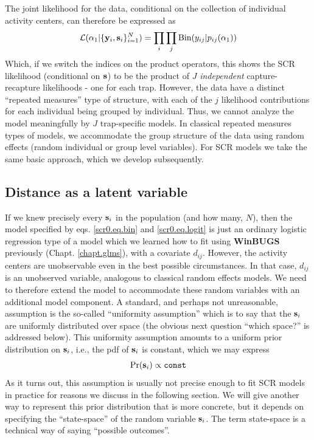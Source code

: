 The joint likelihood for the
data, conditional on the collection of individual activity centers,
can therefore be expressed as
\[
{\cal L}(\alpha_{1} | \{ {\bf y}_{i},{\bf s}_{i} \}_{i=1}^{N})
 =  \prod_{i} \prod_{j} \mbox{Bin}(y_{ij}|p_{ij}(\alpha_{1}))
\]
Which, if we switch the indices on the product operators, this shows
the SCR likelihood (conditional on ${\bf s}$) to be the product of $J$
{\it independent} capture-recapture likelihoods - one for each trap.
However, the data have a distinct ``repeated measures'' type of structure, with
each of the $j$ likelihood contributions for each individual being
grouped by individual. Thus, we cannot analyze the model
meaningfully by $J$ trap-specific models. In classical repeated measures
types of models, we accommodate the group structure of the data using
random effects (random individual or group level variables). For SCR
models we take the same basic approach, which we develop subsequently.

\subsection{Distance as a latent variable}

If we knew precisely every ${\bf s}_{i}$ in the population (and how
many, $N$), then the model specified by eqs. \ref{scr0.eq.bin} and
\ref{scr0.eq.logit} is just an ordinary logistic
regression type of a model which we learned how to fit using {\bf
  WinBUGS} previously (Chapt. \ref{chapt.glms}), with a covariate $d_{ij}$. However,
the activity centers are unobservable even in the best possible
circumstances. In that case, $d_{ij}$ is an unobserved variable,
analogous to classical random effects models. We need to therefore
extend the model to accommodate these random variables with an
additional model component. A standard, and perhaps not unreasonable,
assumption is the so-called ``uniformity assumption'' which is to say
that the ${\bf s}_{i}$ are uniformly distributed over space (the
obvious next question ``which space?'' is addressed below).  This
uniformity assumption amounts to a uniform prior distribution on ${\bf
  s}_{i}$, i.e., the pdf of ${\bf s}_{i}$ is constant, which we may
express
\begin{equation}
	\Pr({\bf s}_{i}) \propto \mbox{\tt const}
\label{scr0.eq.sprior}
\end{equation}
 As it turns out, this assumption is usually not precise
enough to fit SCR models in practice for reasons we discuss in the
following section.  We will give another way to represent this prior
distribution that is more concrete, but it depends on specifying the
``state-space'' of the random variable ${\bf s}_{i}$. The term
state-space is a technical way of saying ``possible outcomes''.

